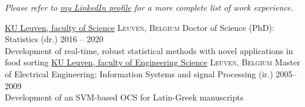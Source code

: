 \documentclass[10pt,a4paper]{article}
\begin{document}
%
%
%
%
%
%

\vspace{-0.2em}
\begin{center}
  \emph{\small Please refer to \href{http://www.linkedin.com/in/ivranckx}{my LinkedIn profile} for a more complete list of work experience.}
\end{center}


\spacedhrule{-0.2em}{-0.4em}


\headedsection
  {\href{https://wet.kuleuven.be/english}{KU Leuven, faculty of Science}}
  {\textsc{Leuven, Belgium}} {%
  \headedsubsection
    {Doctor of Science (PhD): Statistics (dr.)}
    {2016 -- 2020}{\\Development of real-time, robust statistical methods with novel applications in food sorting}
}
\vspace{+0.2em}
\headedsection
  {\href{https://eng.kuleuven.be/en}{KU Leuven, faculty of Engineering Science}}
  {\textsc{Leuven, Belgium}} {%
  \headedsubsection
    {Master of Electrical Engineering: Information Systems and signal Processing (ir.)}
    {2005--2009} {\\Development of an SVM-based OCS for Latin-Greek manuscripts}
}
\end{document}
